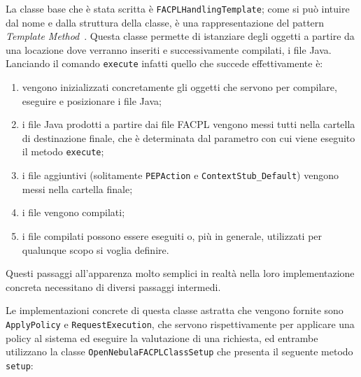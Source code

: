 La classe base che è stata scritta è \texttt{FACPLHandlingTemplate}; come si può intuire dal nome e dalla struttura della classe, è una rappresentazione del pattern \emph{Template Method}~\cite{GOF}. Questa classe permette di istanziare degli oggetti a partire da una locazione dove verranno inseriti e successivamente compilati, i file Java. Lanciando il comando \texttt{execute} infatti quello che succede effettivamente è:
\begin{enumerate}
    \item vengono inizializzati concretamente gli oggetti che servono per compilare, eseguire e posizionare i file Java;
    \item i file Java prodotti a partire dai file FACPL vengono messi tutti nella cartella di destinazione finale, che è determinata dal parametro con cui viene eseguito il metodo \texttt{execute};
    \item i file aggiuntivi (solitamente \texttt{PEPAction} e \texttt{ContextStub\_Default}) vengono messi nella cartella finale;
    \item i file vengono compilati;
    \item i file compilati possono essere eseguiti o, più in generale, utilizzati per qualunque scopo si voglia definire.
\end{enumerate}
Questi passaggi all'apparenza molto semplici in realtà nella loro implementazione concreta necessitano di diversi passaggi intermedi.\par
Le implementazioni concrete di questa classe astratta che vengono fornite sono \texttt{ApplyPolicy} e \texttt{RequestExecution}, che servono rispettivamente per applicare una policy al sistema ed eseguire la valutazione di una richiesta, ed entrambe utilizzano la classe \texttt{OpenNebulaFACPLClassSetup} che presenta il seguente metodo \texttt{setup}:
